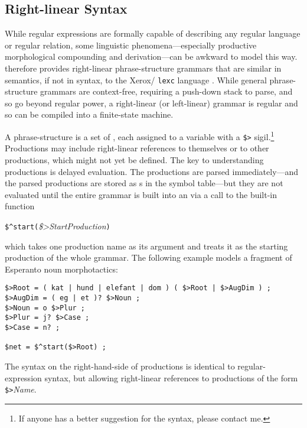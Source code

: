 \subsection{Right-linear Syntax}

While regular expressions are formally capable of describing any
regular language or regular relation, some linguistic
phenomena---especially productive morphological compounding and
derivation---can be awkward to model this way.  \Kleene{}
therefore provides right-linear phrase-structure grammars that
are similar in semantics, if not in syntax, to the
Xerox/ \texttt{lexc} language \citep{beesley+karttunen:2003}.  While general phrase-structure
grammars are context-free, requiring a push-down stack to parse, and so go beyond
regular power, a right-linear (or left-linear) grammar is regular and so can be
compiled into a finite-state machine.  


A \Kleene{} phrase-structure  is a set of
, each
assigned to a variable with a \verb!$>! sigil.\footnote{If anyone has a better
suggestion for the syntax, please contact me.}  Productions may
include right-linear references to themselves or to other
productions, which might not yet be defined.  The key to understanding
productions is delayed evaluation.  The productions are parsed
immediately---and the parsed productions are stored as s in the
symbol table---but they are not evaluated until the entire grammar is built
into an \fsm{} via a call to the built-in function

\vspace{0.5cm}
\verb!$^start(!\emph{\$>StartProduction}\verb!)!
\vspace{0.5cm}

\noindent
which takes one production
name as its argument and treats it as the starting production of the whole
grammar.  The following example models a fragment of Esperanto noun morphotactics:

\begin{Verbatim}
$>Root = ( kat | hund | elefant | dom ) ( $>Root | $>AugDim ) ;
$>AugDim = ( eg | et )? $>Noun ;
$>Noun = o $>Plur ;
$>Plur = j? $>Case ;
$>Case = n? ;

$net = $^start($>Root) ;
\end{Verbatim}

\noindent
The syntax on the right-hand-side of productions is identical to regular-expression syntax, but allowing right-linear references to productions of the form
\verb!$>!\emph{Name}.

